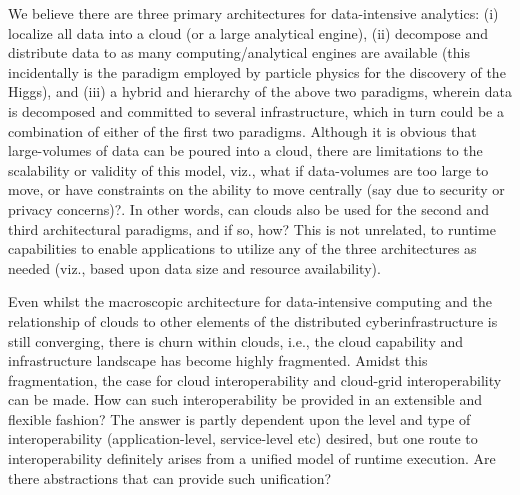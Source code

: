 \documentclass[times]{cpeauth}
\newcommand{\alnote}[1]{ {\textcolor{green} { ***andreL: #1 }}}
\newcommand{\alnote}[1]{}
\begin{document}
We believe there are three primary architectures for data-intensive
analytics: (i) localize all data into a cloud (or a large analytical
engine), (ii) decompose and distribute data to as many
computing/analytical engines are available (this incidentally is the
paradigm employed by particle physics for the discovery of the Higgs),
and (iii) a hybrid and hierarchy of the above two paradigms, wherein
data is decomposed and committed to several infrastructure, which in
turn could be a combination of either of the first two paradigms.
Although it is obvious that large-volumes of data can be poured into a
cloud, there are limitations to the scalability or validity of this
model, viz., what if data-volumes are too large to move, or have
constraints on the ability to move centrally (say due to security or
privacy concerns)?. In other words, can clouds also be used for the
second and third architectural paradigms, and if so,
how? %
This is not unrelated, to runtime capabilities to enable applications
to utilize any of the three architectures as needed (viz., based upon
data size and resource availability).



Even whilst the macroscopic architecture for data-intensive computing
and the relationship of clouds to other elements of the distributed
cyberinfrastructure is still converging, there is churn within clouds,
i.e., the cloud capability and infrastructure landscape has become
highly fragmented. Amidst this fragmentation, 
the case for cloud interoperability and cloud-grid interoperability
can be made. %
How can such interoperability be provided in an extensible and
flexible fashion?  The answer is partly dependent upon the level and
type of interoperability (application-level, service-level etc)
desired, but one route to interoperability definitely arises from a
unified model of runtime execution.  Are there abstractions that can
provide such unification?
\end{document}
